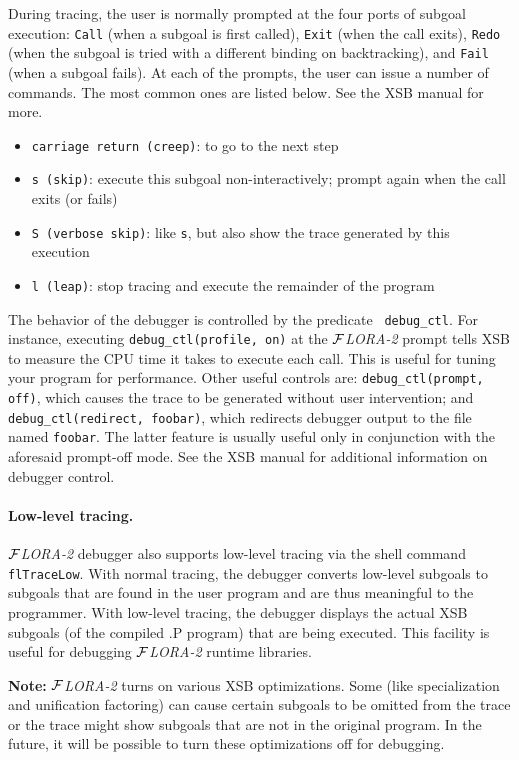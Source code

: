 \documentclass[11pt]{article}
\newcommand{\FLORA}{{\mbox{${\cal F}${\small\it LORA}\rm\emph{-2}}}\xspace}
\begin{document}
During tracing, the user is normally prompted at the four ports of subgoal
execution: {\tt Call} (when a subgoal is first called), {\tt Exit} (when
the call exits), {\tt Redo} (when the subgoal is tried with a different
binding on backtracking), and {\tt Fail} (when a subgoal fails).
At each of the prompts, the user can issue a number of commands. The most
common ones are listed below. See the XSB manual for more.
\begin{itemize}
  \item {\tt carriage return (creep)}:  to go to the next step  
  \item {\tt s (skip)}: execute this subgoal non-interactively; prompt
    again when the call exits (or fails)
  \item {\tt S (verbose skip)}: like {\tt s}, but also show the trace
    generated by this execution
  \item {\tt l (leap)}: stop tracing and execute the remainder of the
    program
\end{itemize}
The behavior of the debugger is controlled by the predicate {\tt
  debug\_ctl}. For instance, executing {\tt debug\_ctl(profile, on)} at the
\FLORA prompt tells XSB to measure the CPU time it takes to execute each
call. This is useful for tuning your program for performance. Other useful
controls are: {\tt debug\_ctl(prompt, off)}, which causes the trace to be
generated without user intervention; and {\tt debug\_ctl(redirect,
  foobar)}, which redirects debugger output to the file named {\tt foobar}.
The latter feature is usually useful only in conjunction with the aforesaid
prompt-off mode. See the XSB manual for additional information on debugger
control.

\paragraph{Low-level tracing.}
\FLORA debugger also supports low-level tracing via the shell command {\tt
  flTraceLow}. With normal tracing, the debugger converts low-level
subgoals to subgoals that are found in the user program and are thus
meaningful to the programmer. With low-level tracing, the debugger displays
the actual XSB subgoals (of the compiled .P program) that are being
executed. This facility is useful for debugging \FLORA runtime libraries.

{\bf Note:} \FLORA turns on various XSB optimizations. Some (like
specialization and unification factoring) can cause certain subgoals to
be omitted from the trace or the trace might show subgoals that
are not in the original program. In the future, it will be possible to turn
these optimizations off for debugging.
\end{document}
